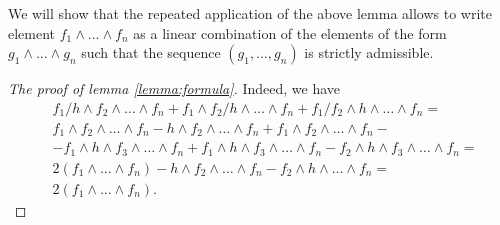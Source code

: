 \documentclass[12pt]{extarticle}
\def\wdw{\wedge\dots\wedge}
\begin{document}
We will show that the repeated application of the above lemma allows to write element $f_1\wdw f_n$ as a linear combination of the elements of the form $g_1\wdw g_n$ such that the sequence $(g_1,\dots, g_n)$ is strictly admissible.

\begin{proof}[The proof of lemma \ref{lemma:formula}]
    Indeed, we have
    \begin{align*}
        &f_1/h\wedge f_2\wdw f_n+f_1\wedge f_2/h\wdw f_n+f_1/f_2\wedge h\wdw f_n=\\
        &f_1\wedge f_2\wdw f_n-h\wedge f_2\wdw f_n+f_1\wedge f_2\wdw f_n-\\
        &-f_1\wedge h\wedge f_3\wdw f_n+f_1\wedge h\wedge f_3\wdw f_n-f_2\wedge h\wedge f_3\wdw f_n=\\
        &2\left(f_1\wdw f_n\right)-h\wedge f_2\wdw f_n-f_2\wedge h\wdw f_n=\\
        &2\left(f_1\wdw f_n\right).
    \end{align*}
\end{proof}
\end{document}
